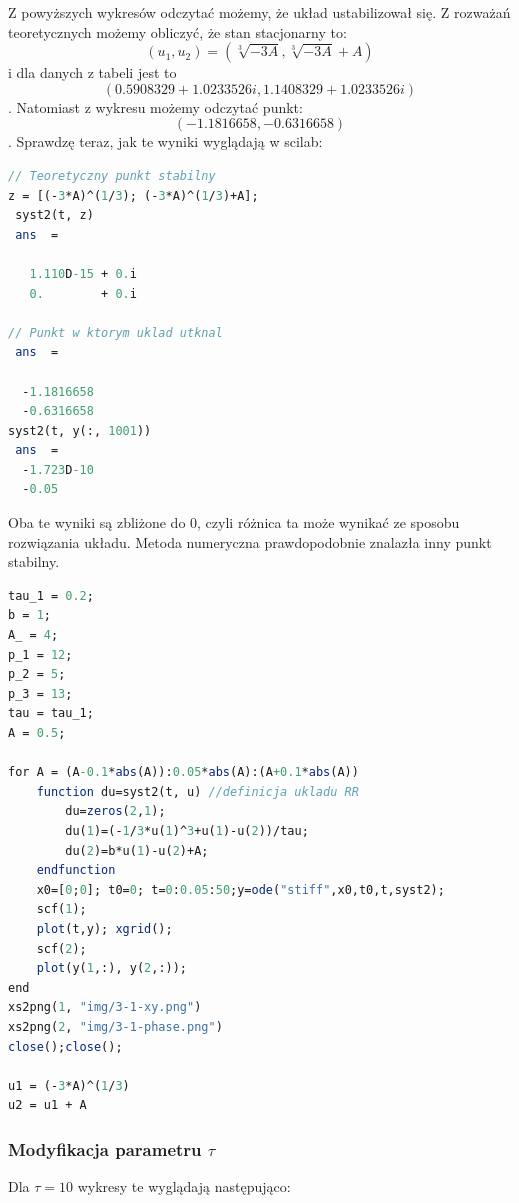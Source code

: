 \documentclass[12pt]{article}
\begin{document}
Z powyższych wykresów odczytać możemy, że układ ustabilizował się. Z rozważań teoretycznych możemy obliczyć, że stan stacjonarny to: $$(u_1, u_2) = (\sqrt[3]{-3A}, \sqrt[3]{-3A}+A)$$ i dla danych z tabeli jest to
$$(0.5908329 + 1.0233526i, 1.1408329 + 1.0233526i)$$. Natomiast z wykresu możemy odczytać punkt: 
$$(-1.1816658, -0.6316658)$$. Sprawdzę teraz, jak te wyniki wyglądają w scilab:

\begin{lstlisting}[label={code1},language=scilab,caption={Sprawdzenie wyniku}]
// Teoretyczny punkt stabilny
z = [(-3*A)^(1/3); (-3*A)^(1/3)+A];
 syst2(t, z)
 ans  =

   1.110D-15 + 0.i
   0.        + 0.i

// Punkt w ktorym uklad utknal
 ans  =

  -1.1816658
  -0.6316658
syst2(t, y(:, 1001))
 ans  =
  -1.723D-10
  -0.05   
\end{lstlisting}
Oba te wyniki są zbliżone do 0, czyli różnica ta może wynikać ze sposobu rozwiązania układu. Metoda numeryczna prawdopodobnie znalazła inny punkt stabilny.

\begin{lstlisting}[label={code1},language=scilab,caption={Kod generujący powyższe wykresy}]
tau_1 = 0.2;
b = 1;
A_ = 4;
p_1 = 12;
p_2 = 5;
p_3 = 13;
tau = tau_1;
A = 0.5;

for A = (A-0.1*abs(A)):0.05*abs(A):(A+0.1*abs(A))
    function du=syst2(t, u) //definicja ukladu RR
        du=zeros(2,1);
        du(1)=(-1/3*u(1)^3+u(1)-u(2))/tau;
        du(2)=b*u(1)-u(2)+A;
    endfunction
    x0=[0;0]; t0=0; t=0:0.05:50;y=ode("stiff",x0,t0,t,syst2);
    scf(1);
    plot(t,y); xgrid();
    scf(2);
    plot(y(1,:), y(2,:));
end
xs2png(1, "img/3-1-xy.png")
xs2png(2, "img/3-1-phase.png")
close();close();

u1 = (-3*A)^(1/3)
u2 = u1 + A
\end{lstlisting}

\subsubsection{Modyfikacja parametru $\tau$}
Dla $\tau = 10$ wykresy te wyglądają następująco:
\end{document}
